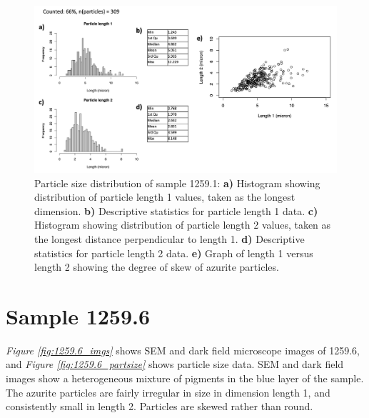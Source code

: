 \begin{figure}[H]
\centering
  \includegraphics[width=\linewidth]{1259-1_partsize}
\caption[Particle size distribution, sample 1259.1.]{Particle size distribution of sample 1259.1: \textbf{a)} Histogram showing distribution of particle length 1 values, taken as the longest dimension. \textbf{b)} Descriptive statistics for particle length 1 data. \textbf{c)} Histogram showing distribution of particle length 2 values, taken as the longest distance perpendicular to length 1. \textbf{d)} Descriptive statistics for particle length 2 data. \textbf{e)} Graph of length 1 versus length 2 showing the degree of skew of azurite particles.}
\label{fig:1259.1_partsize}
\end{figure}




\section{Sample 1259.6}

\textit{Figure \ref{fig:1259.6_imgs}} shows SEM and dark field microscope images of 1259.6, and \textit{Figure \ref{fig:1259.6_partsize}} shows particle size data. SEM and dark field images show a heterogeneous mixture of pigments in the blue layer of the sample. The azurite particles are fairly irregular in size in dimension length 1, and consistently small in length 2. Particles are skewed rather than round. 

